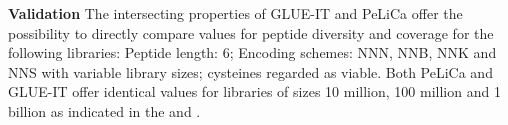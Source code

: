 {\bf Validation }
The intersecting properties of GLUE-IT and PeLiCa offer the possibility to directly compare values for peptide diversity and coverage for the following libraries: Peptide length: 6; Encoding schemes: NNN, NNB, NNK and NNS with variable library sizes; cysteines regarded as viable. Both PeLiCa and GLUE-IT offer identical values for libraries of sizes 10 million, 100 million and 1 billion as indicated in the  and .
